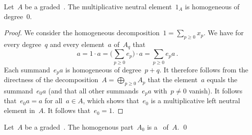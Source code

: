\begin{proposition}
	Let~$A$ be a graded~\algebra{$\kf$}.
	The multiplicative neutral element~$1_A$ is homogeneous of degree~$0$.
\end{proposition}


\begin{proof}
	We consider the homogeneous decomposition~$1 = \sum_{p \geq 0} x_p$.
	We have for every degree~$q$ and every element~$a$ of~$A_q$ that
	\[
		a
		=
		1 \cdot a
		=
		\Biggl( \sum_{p \geq 0} e_p \Biggr) \cdot a
		=
		\sum_{p \geq 0} e_p a  \,.
	\]
	Each summand~$e_p a$ is homogeneous of degree~$p + q$.
	It therefore follows from the directness of the decomposition~$A = \bigoplus_{p \geq 0} A_p$ that the element~$a$ equals the summand~$e_0 a$ (and that all other summands~$e_p a$ with~$p \neq 0$ vanish).
	It follows that~$e_0 a = a$ for all~$a \in A$, which shows that~$e_0$ is a multiplicative left neutral element in~$A$.
	It follows that~$e_0 = 1$.
\end{proof}


\begin{corollary}
	Let~$A$ be a graded~\algebra{$\kf$}.
	The homogenous part~$A_0$ is a~\subalgebra{$\kf$} of~$A$.
	\qed
\end{corollary}


